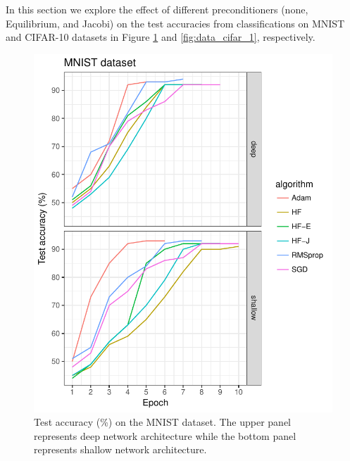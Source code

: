 \documentclass[10pt,twocolumn,letterpaper]{article}
\begin{document}
In this section we explore the effect of different preconditioners (none, Equilibrium, and Jacobi) on the test accuracies from classifications on MNIST and CIFAR-10 datasets in Figure \ref{fig:data_mnist_1} and \ref{fig:data_cifar_1}, respectively.




\begin{figure}
\begin{center}
\includegraphics[scale=0.7]{plot_1.pdf}
\caption{Test accuracy (\%) on the MNIST dataset. The upper panel represents deep network architecture while the bottom panel represents shallow network architecture.}
\label{fig:data_mnist_1}
\end{center}
\end{figure}    
\end{document}
